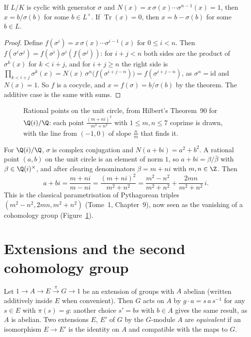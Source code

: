 \begin{corollary}\label{cor:hilbert90}
If $L/K$ is cyclic with generator $\sigma$ and $N(x)=x\,\sigma(x)\cdots\sigma^{n-1}(x)=1$, then $x=b/\sigma(b)$ for some $b\in L^\times$. If $\operatorname{Tr}(x)=0$, then $x=b-\sigma(b)$ for some $b\in L$.
\end{corollary}

\begin{proof}
Define $f(\sigma^i)=x\,\sigma(x)\cdots\sigma^{i-1}(x)$ for $0\le i<n$. Then $f(\sigma^i\sigma^j)=f(\sigma^i)\sigma^i(f(\sigma^j))$: for $i+j<n$ both sides are the product of $\sigma^k(x)$ for $k<i+j$, and for $i+j\ge n$ the right side is
$\prod_{k<i+j}\sigma^k(x)=N(x)\,\sigma^n\bigl(f(\sigma^{i+j-n})\bigr)=f(\sigma^{i+j-n})$, as $\sigma^n=\mathrm{id}$ and $N(x)=1$. So $f$ is a cocycle, and $x=f(\sigma)=b/\sigma(b)$ by the theorem. The additive case is the same with sums.
\end{proof}

\begin{figure}[ht]
\centering
{}
\caption{Rational points on the unit circle, from Hilbert's Theorem~90 for $\Q(i)/\Q$: each point $\frac{(m+ni)^2}{m^2+n^2}$ with $1\le m,n\le7$ coprime is drawn, with the line from $(-1,0)$ of slope $\frac nm$ that finds it.}
\label{fig:rationalcircle}
\end{figure}

\begin{example}\label{ex:pythagoras}
For $\Q(i)/\Q$, $\sigma$ is complex conjugation and $N(a+bi)=a^2+b^2$. A rational point $(a,b)$ on the unit circle is an element of norm $1$, so $a+bi=\beta/\bar\beta$ with $\beta\in\Q(i)^\times$, and after clearing denominators
$\beta=m+ni$ with $m,n\in\Z$. Then
\[
a+bi=\frac{m+ni}{m-ni}=\frac{(m+ni)^2}{m^2+n^2}=\frac{m^2-n^2}{m^2+n^2}+\frac{2mn}{m^2+n^2}\,i .
\]
This is the classical parametrisation of Pythagorean triples $(m^2-n^2,2mn,m^2+n^2)$ (Tome~1, Chapter~9), now seen as the vanishing of a cohomology group (Figure~\ref{fig:rationalcircle}).
\end{example}

\section{Extensions and the second cohomology group}\label{sec:extensions}

Let $1\to A\xrightarrow{}E\xrightarrow{\pi}G\to1$ be an extension of groups with $A$ abelian (written additively inside $E$ when convenient). Then $G$ acts on $A$ by $g\cdot a=s\,a\,s^{-1}$ for any $s\in E$ with $\pi(s)=g$: another
choice $s'=bs$ with $b\in A$ gives the same result, as $A$ is abelian. Two extensions $E$, $E'$ of $G$ by the $G$-module $A$ are \emph{equivalent} if an isomorphism $E\to E'$ is the identity on $A$ and compatible with the maps to $G$.

